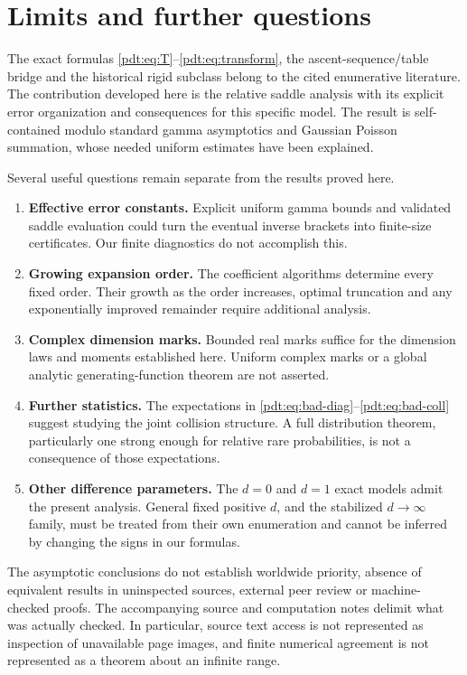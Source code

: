 \section{Limits and further questions}
The exact formulas \eqref{pdt:eq:T}--\eqref{pdt:eq:transform}, the ascent-sequence/table bridge and the historical rigid subclass belong to the cited enumerative literature. The contribution developed here is the relative saddle analysis with its explicit error organization and consequences for this specific model. The result is self-contained modulo standard gamma asymptotics and Gaussian Poisson summation, whose needed uniform estimates have been explained.

Several useful questions remain separate from the results proved here.
\begin{enumerate}
\item \textbf{Effective error constants.} Explicit uniform gamma bounds and validated saddle evaluation could turn the eventual inverse brackets into finite-size certificates. Our finite diagnostics do not accomplish this.
\item \textbf{Growing expansion order.} The coefficient algorithms determine every fixed order. Their growth as the order increases, optimal truncation and any exponentially improved remainder require additional analysis.
\item \textbf{Complex dimension marks.} Bounded real marks suffice for the dimension laws and moments established here. Uniform complex marks or a global analytic generating-function theorem are not asserted.
\item \textbf{Further statistics.} The expectations in \eqref{pdt:eq:bad-diag}--\eqref{pdt:eq:bad-coll} suggest studying the joint collision structure. A full distribution theorem, particularly one strong enough for relative rare probabilities, is not a consequence of those expectations.
\item \textbf{Other difference parameters.} The $d=0$ and $d=1$ exact models admit the present analysis. General fixed positive $d$, and the stabilized $d\to\infty$ family, must be treated from their own enumeration and cannot be inferred by changing the signs in our formulas.
\end{enumerate}
The asymptotic conclusions do not establish worldwide priority, absence of equivalent results in uninspected sources, external peer review or machine-checked proofs. The accompanying source and computation notes delimit what was actually checked. In particular, source text access is not represented as inspection of unavailable page images, and finite numerical agreement is not represented as a theorem about an infinite range.

